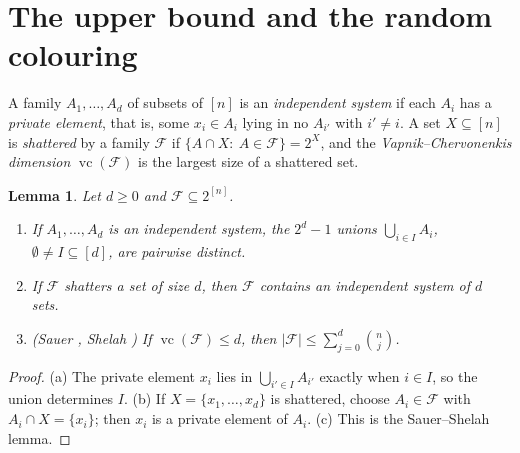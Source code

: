 \documentclass[11pt,reqno]{amsart}
\numberwithin{equation}{section}
\theoremstyle{plain}
\newtheorem{lemma}[theorem]{Lemma}
\theoremstyle{definition}
\theoremstyle{remark}
\newcommand{\cF}{\mathcal{F}}
\DeclareMathOperator{\vc}{vc}
\begin{document}
\section{The upper bound and the random colouring}
\label{sec:upper}

A family $A_1,\dots,A_d$ of subsets of $[n]$ is an \emph{independent
system} if each $A_i$ has a \emph{private element}, that is, some
$x_i\in A_i$ lying in no $A_{i'}$ with $i'\ne i$. A set $X\subseteq[n]$ is
\emph{shattered} by a family $\cF$ if $\{A\cap X:\ A\in\cF\}=2^{X}$, and
the \emph{Vapnik--Chervonenkis dimension} $\vc(\cF)$ is the largest size of
a shattered set.

\begin{lemma}
\label{lem:indep}
Let $d\ge0$ and $\cF\subseteq2^{[n]}$.
\begin{enumerate}[label=\textup{(\alph*)},leftmargin=2em]
\item If $A_1,\dots,A_d$ is an independent system, the $2^{d}-1$ unions
$\bigcup_{i\in I}A_i$, $\emptyset\ne I\subseteq[d]$, are pairwise
distinct.
\item If $\cF$ shatters a set of size $d$, then $\cF$ contains an
independent system of $d$ sets.
\item \textup{(Sauer \cite{Sa72}, Shelah \cite{Sh72})} If $\vc(\cF)\le
d$, then $|\cF|\le\sum_{j=0}^{d}\binom nj$.
\end{enumerate}
\end{lemma}

\begin{proof}
(a) The private element $x_i$ lies in $\bigcup_{i'\in I}A_{i'}$ exactly
when $i\in I$, so the union determines $I$. (b) If $X=\{x_1,\dots,x_d\}$
is shattered, choose $A_i\in\cF$ with $A_i\cap X=\{x_i\}$; then $x_i$ is a
private element of $A_i$. (c) This is the Sauer--Shelah lemma.
\end{proof}
\end{document}
